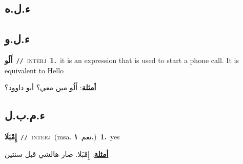 \documentclass[10pt,a4paper,twoside]{article} %
\begin{document}
\begin{multicols}{2}
\vspace{-3mm}
\subsection*{\color{blue}\foreignlanguage{arabic}{ء.ل.ه}\color{blue}{ (ntws)}} 

\vspace{-3mm}
\subsection*{\color{blue}\foreignlanguage{arabic}{ء.ل.و}\color{blue}{ (ntws)}} 

{\setlength\topsep{0pt}\textbf{\foreignlanguage{arabic}{أَلُو}}\ {\color{gray}\texttt{//}\color{black}}\ \textsc{interj}\ \textbf{1.}~it is an expression that is used to start a phone call. It is equivalent to Hello\  \begin{flushright}\color{gray}\foreignlanguage{arabic}{\textbf{\underline{\foreignlanguage{arabic}{أمثلة}}}: أَلُو مين معي؟ أبو داوود؟}\end{flushright}\color{black}} \vspace{2mm}

\vspace{-3mm}
\subsection*{\color{blue}\foreignlanguage{arabic}{ء.م.ب.ل}\color{blue}{ (ntws)}} 

{\setlength\topsep{0pt}\textbf{\foreignlanguage{arabic}{إِمْبَلَا}}\ {\color{gray}\texttt{//}\color{black}}\ \textsc{interj}\ \color{gray}(msa. \foreignlanguage{arabic}{نعم}~\foreignlanguage{arabic}{\textbf{١.}})\color{black}\ \textbf{1.}~yes\  \begin{flushright}\color{gray}\foreignlanguage{arabic}{\textbf{\underline{\foreignlanguage{arabic}{أمثلة}}}: إِمْبَلا. صار هالشي قبل سنتين}\end{flushright}\color{black}} \vspace{2mm}


\end{multicols}
\end{document}
